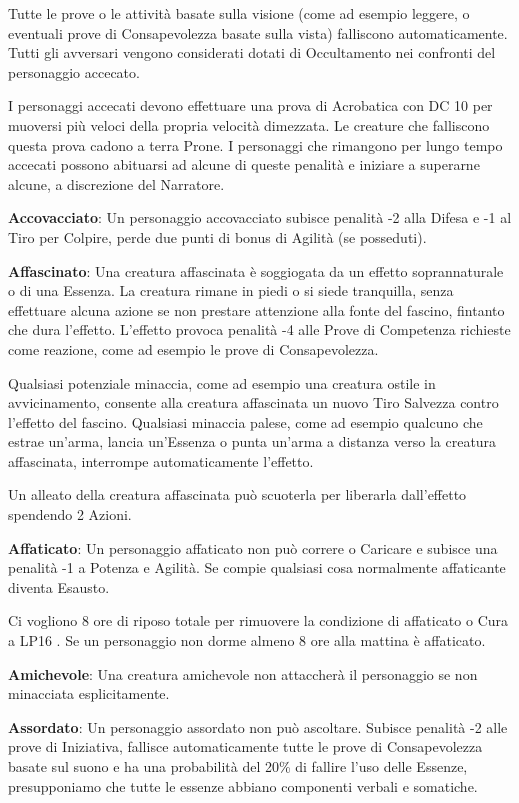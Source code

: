\documentclass[a4paper,11pt,twoside,openany]{book}
\begin{document}
{Tutte le prove o le attività basate sulla visione (come ad esempio leggere, o eventuali prove di Consapevolezza basate sulla vista) falliscono automaticamente. Tutti gli avversari vengono considerati dotati di Occultamento nei confronti del personaggio accecato. 

I personaggi accecati devono effettuare una prova di Acrobatica con DC 10 per muoversi più veloci della propria velocità dimezzata. Le creature che falliscono questa prova cadono a terra Prone. I personaggi che rimangono per lungo tempo accecati possono abituarsi ad alcune di queste penalità e iniziare a superarne alcune, a discrezione del Narratore.

\textbf{Accovacciato}: Un personaggio accovacciato subisce penalità -2 alla Difesa e -1 al Tiro per Colpire, perde due punti di bonus di Agilità (se posseduti).

\textbf{Affascinato}: Una creatura affascinata è soggiogata da un effetto soprannaturale o di una Essenza. La creatura rimane in piedi o si siede tranquilla, senza effettuare alcuna azione se non prestare attenzione alla fonte del fascino, fintanto che dura l'effetto. L'effetto provoca penalità -4 alle Prove di Competenza richieste come reazione, come ad esempio le prove di Consapevolezza. 

Qualsiasi potenziale minaccia, come ad esempio una creatura ostile in avvicinamento, consente alla creatura affascinata un nuovo Tiro Salvezza contro l'effetto del fascino. Qualsiasi minaccia palese, come ad esempio qualcuno che estrae un'arma, lancia un'Essenza o punta un'arma a distanza verso la creatura affascinata, interrompe automaticamente l'effetto. 

Un alleato della creatura affascinata può scuoterla per liberarla dall'effetto spendendo 2 Azioni.

\textbf{Affaticato}: Un personaggio affaticato non può correre o Caricare e subisce una penalità -1 a Potenza e Agilità. Se compie qualsiasi cosa normalmente affaticante diventa Esausto. 

Ci vogliono 8 ore di riposo totale per rimuovere la condizione di affaticato o Cura a LP16 . Se un personaggio non dorme almeno 8 ore alla mattina è affaticato.

\textbf{Amichevole}: Una creatura amichevole non attaccherà il personaggio se non minacciata esplicitamente.

\textbf{Assordato}: Un personaggio assordato non può ascoltare. Subisce penalità -2 alle prove di Iniziativa, fallisce automaticamente tutte le prove di Consapevolezza basate sul suono e ha una probabilità del 20\% di fallire l'uso delle Essenze, presupponiamo che tutte le essenze abbiano componenti verbali e somatiche.

}
\end{document}
